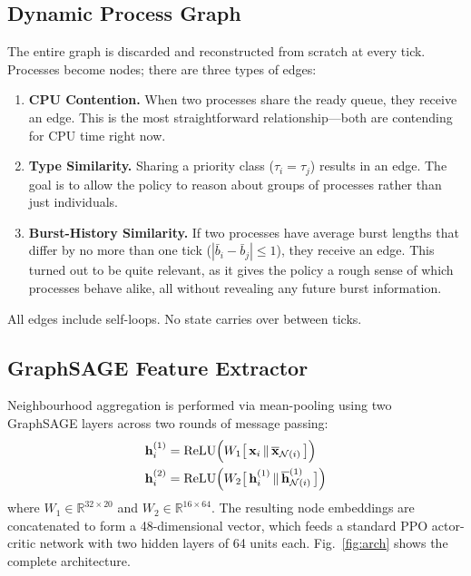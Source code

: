 \documentclass[conference]{IEEEtran}
\begin{document}
\subsection{Dynamic Process Graph}

The entire graph is discarded and reconstructed from scratch at every tick.
Processes become nodes; there are three types of edges:
\begin{enumerate}
\item \textbf{CPU Contention.} When two processes share the ready queue,
they receive an edge. This is the most straightforward relationship---both
are contending for CPU time right now.
\item \textbf{Type Similarity.} Sharing a priority class
($\tau_i = \tau_j$) results in an edge. The goal is to allow the policy to
reason about groups of processes rather than just individuals.
\item \textbf{Burst-History Similarity.} If two processes have average
burst lengths that differ by no more than one tick
($|\bar{b}_i - \bar{b}_j| \le 1$), they receive an edge. This turned out to
be quite relevant, as it gives the policy a rough sense of which processes
behave alike, all without revealing any future burst information.
\end{enumerate}
All edges include self-loops. No state carries over between ticks.

\subsection{GraphSAGE Feature Extractor}

Neighbourhood aggregation is performed via mean-pooling using two
GraphSAGE layers across two rounds of message passing:
\begin{align}
\mathbf{h}_i^{(1)} &= \mathrm{ReLU}\Bigl(W_1 \bigl[\, \mathbf{x}_i \,\Vert\, \overline{\mathbf{x}}_{\mathcal{N}(i)} \,\bigr]\Bigr) \label{eq:sage1}\\
\mathbf{h}_i^{(2)} &= \mathrm{ReLU}\Bigl(W_2 \bigl[\, \mathbf{h}_i^{(1)} \,\Vert\, \overline{\mathbf{h}}^{(1)}_{\mathcal{N}(i)} \,\bigr]\Bigr) \label{eq:sage2}
\end{align}
where $W_1 \in \mathbb{R}^{32\times 20}$ and $W_2 \in \mathbb{R}^{16\times 64}$.
The resulting node embeddings are concatenated to form a 48-dimensional
vector, which feeds a standard PPO actor-critic network with two hidden
layers of 64 units each. Fig.~\ref{fig:arch} shows the complete
architecture.
\end{document}
